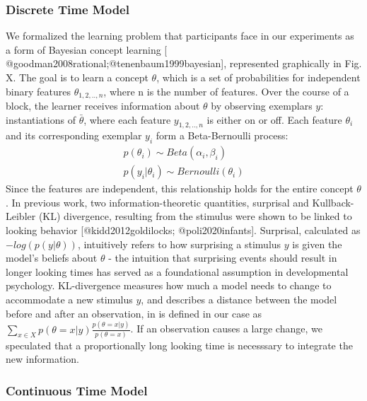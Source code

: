\documentclass[
]{article}
\author{}
\date{\vspace{-2.5em}}
\begin{document}
{
\setcounter{tocdepth}{2}
\tableofcontents
}
\hypertarget{discrete-time-model}{%
\subsubsection{Discrete Time Model}\label{discrete-time-model}}

We formalized the learning problem that participants face in our experiments as a form of Bayesian concept learning {[} @goodman2008rational;@tenenbaum1999bayesian{]}, represented graphically in Fig. X. The goal is to learn a concept \(\theta\), which is a set of probabilities for independent binary features \(\theta_{1,2,..,n}\), where n is the number of features. Over the course of a block, the learner receives information about \(\theta\) by observing exemplars \(y\): instantiations of \(\bar{\theta}\), where each feature \(y_{1,2,..,n}\) is either on or off. Each feature \(\theta_i\) and its corresponding exemplar \(y_i\) form a Beta-Bernoulli process:
\begin{eqnarray}
p(\theta_i) \sim Beta(\alpha_i,\beta_i) \\
p(y_i|\theta_i) \sim Bernoulli(\theta_i)
\end{eqnarray}
Since the features are independent, this relationship holds for the entire concept \(\theta\). In previous work, two information-theoretic quantities, surprisal and Kullback-Leibler (KL) divergence, resulting from the stimulus were shown to be linked to looking behavior {[}@kidd2012goldilocks; @poli2020infants{]}. Surprisal, calculated as \(-log(p(y|\theta))\), intuitively refers to how surprising a stimulus \(y\) is given the model's beliefs about \(\theta\) - the intuition that surprising events should result in longer looking times has served as a foundational assumption in developmental psychology. KL-divergence measures how much a model needs to change to accommodate a new stimulus \(y\), and describes a distance between the model before and after an observation, in is defined in our case as \(\sum_{x \in X}{p(\theta = x|y)\frac{p(\theta = x|y)}{p(\theta = x)}}\). If an observation causes a large change, we speculated that a proportionally long looking time is necesssary to integrate the new information.

\hypertarget{continuous-time-model}{%
\subsubsection{Continuous Time Model}\label{continuous-time-model}}
\end{document}
